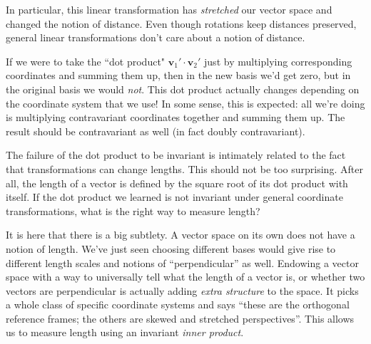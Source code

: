\documentclass[../master.tex]{subfiles}
\begin{document}
	
	In particular, this linear transformation has \emph{stretched} our vector space and changed the notion of distance. Even though rotations keep distances preserved, general linear transformations don't care about a notion of distance. 
	
	If we were to take the ``dot product" $\mathbf v_1' \cdot \mathbf v_2'$ just by multiplying corresponding coordinates and summing them up, then in the new basis we'd get zero, but in the original basis we would \emph{not}. This dot product actually changes depending on the coordinate system that we use! In some sense, this is expected: all we're doing is multiplying contravariant coordinates together and summing them up. The result should be contravariant as well (in fact doubly contravariant).
	
	
	The failure of the dot product to be invariant is intimately related to the fact that transformations can change lengths. This should not be too surprising. After all, the length of a vector is defined by the square root of its dot product with itself. If the dot product we learned is not invariant under general coordinate transformations, what is the right way to measure length? 
	
	It is here that there is a big subtlety. A vector space on its own does not have a notion of length. We've just seen choosing different bases would give rise to different length scales and notions of ``perpendicular'' as well. Endowing a vector space with a way to universally tell what the length of a vector is, or whether two vectors are perpendicular is actually adding \emph{extra structure} to the space. It picks a whole class of specific coordinate systems and says ``these are the orthogonal reference frames; the others are skewed and stretched perspectives''. This allows us to measure length using an invariant \emph{inner product}. 
	
\end{document}
